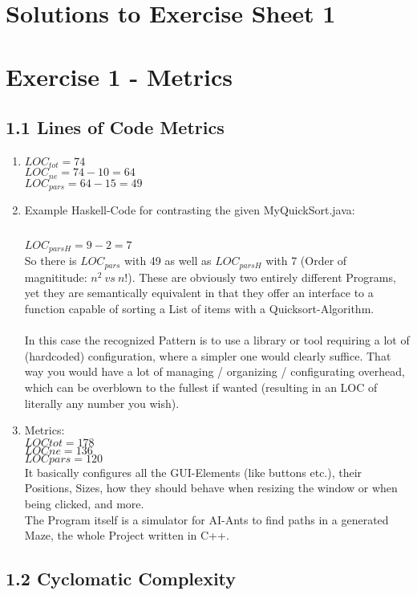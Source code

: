 \documentclass{scrartcl}
\begin{document}
\section*{Solutions to Exercise Sheet 1}

\section*{Exercise 1 - Metrics}

\subsection*{1.1 Lines of Code Metrics}

\begin{enumerate}[i]
    \item $LOC_{tot} = 74 $\\
          $ LOC_{ne} = 74 - 10 = 64 $\\
          $ LOC_{pars} = 64 - 15 = 49 $\\
    \item Example Haskell-Code for contrasting the given MyQuickSort.java: \\
        \inputminted[linenos]{Haskell}{MyQuickSort.hs}



        $LOC_{parsH} = 9 - 2 = 7$ \\
        So there is $LOC_{pars}$ with 49 as well as $LOC_{parsH}$ with 7 (Order of magnititude: $n^2\ vs\ n$!).
        These are obviously two entirely different Programs, yet they are semantically equivalent in that they
        offer an interface to a function capable of sorting a List of items with a Quicksort-Algorithm. \\ \\

        In this case the recognized Pattern is to use a library or tool requiring a lot of (hardcoded) configuration,
        where a simpler one would clearly suffice. That way you would have a lot of managing / organizing / configurating
        overhead, which can be overblown to the fullest if wanted (resulting in an LOC of literally any number you wish).

    \item Metrics: \\
        $ LOCtot = 178  $ \\
        $ LOCne = 136   $ \\
        $ LOCpars = 120 $ \\
        It basically configures all the GUI-Elements (like buttons etc.), their Positions, Sizes,
        how they should behave when resizing the window or when being clicked, and more. \\
        The Program itself is a simulator for AI-Ants to find paths in a generated Maze, the whole Project written in C++.


\end{enumerate}



\subsection*{1.2 Cyclomatic Complexity}
\end{document}
